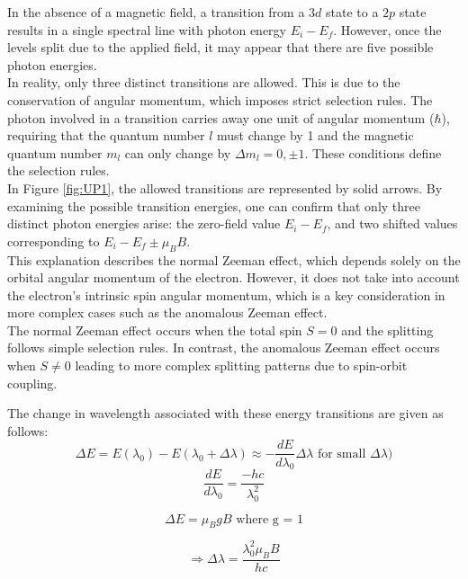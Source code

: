 \documentclass[11pt,twocolumn, a4paper]{article}
\numberwithin{equation}{section} %
\numberwithin{figure}{section} %
\numberwithin{table}{section} %
\begin{document}
In the absence of a magnetic field, a transition from a $3d$ state to a $2p$ state results in a single spectral line with photon energy $E_i - E_f$. However, once the levels split due to the applied field, it may appear that there are five possible photon energies. \\ 

In reality, only three distinct transitions are allowed. This is due to the conservation of angular momentum, which imposes strict selection rules. The photon involved in a transition carries away one unit of angular momentum ($\hbar$), requiring that the quantum number $l$ must change by 1 and the magnetic quantum number $m_l$ can only change by $\Delta m_l = 0, \pm1$. These conditions define the selection rules. \\ 

 In Figure \ref{fig:UP1}, the allowed transitions are represented by solid arrows. By examining the possible transition energies, one can confirm that only three distinct photon energies arise: the zero-field value $E_i - E_f$, and two shifted values corresponding to $E_i - E_f \pm \mu_B B$. \\

This explanation describes the normal Zeeman effect, which depends solely on the orbital angular momentum of the electron. However, it does not take into account the electron's intrinsic spin angular momentum, which is a key consideration in more complex cases such as the anomalous Zeeman effect. 
\\ 

The normal Zeeman effect occurs when the total spin \(S = 0\) and the splitting follows simple selection rules. In contrast, the anomalous Zeeman effect occurs when \(S \ne 0\) leading to more complex splitting patterns due to spin-orbit coupling.

The change in wavelength associated with these energy transitions are given as follows:
\[
\Delta E = E(\lambda_0) - E(\lambda_0 + \Delta \lambda) \approx -\frac{dE}{d\lambda_0}\Delta\lambda \text{ for small } \Delta \lambda)
\]
\[
\frac{dE}{d\lambda_0} = \frac{-hc}{\lambda_0^2}
\]

\[
\Delta E = \mu_B g B \text{ where g = 1}
\]

\begin{equation}\label{eq:bohr}
    \Rightarrow \Delta \lambda = \frac{\lambda_0^2\mu_BB}{hc}
\end{equation}
\end{document}
